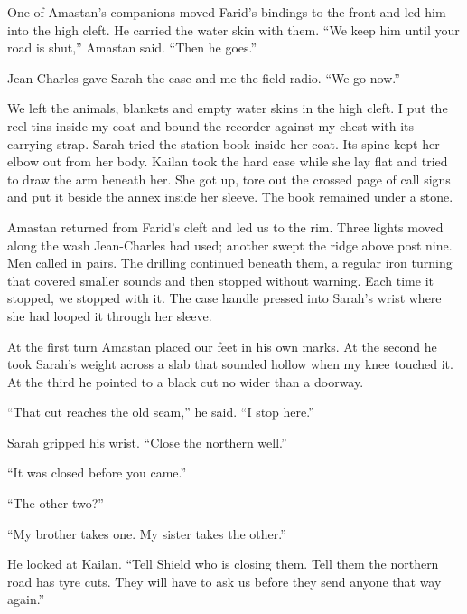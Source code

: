 One of Amastan's companions moved Farid's bindings to the front and led him into the high cleft. He carried the water skin with them. ``We keep him until your road is shut,'' Amastan said. ``Then he goes.''\par

Jean-Charles gave Sarah the case and me the field radio. ``We go now.''\par

We left the animals, blankets and empty water skins in the high cleft. I put the reel tins inside my coat and bound the recorder against my chest with its carrying strap. Sarah tried the station book inside her coat. Its spine kept her elbow out from her body. Kailan took the hard case while she lay flat and tried to draw the arm beneath her. She got up, tore out the crossed page of call signs and put it beside the annex inside her sleeve. The book remained under a stone.\par

Amastan returned from Farid's cleft and led us to the rim. Three lights moved along the wash Jean-Charles had used; another swept the ridge above post nine. Men called in pairs. The drilling continued beneath them, a regular iron turning that covered smaller sounds and then stopped without warning. Each time it stopped, we stopped with it. The case handle pressed into Sarah's wrist where she had looped it through her sleeve.\par

At the first turn Amastan placed our feet in his own marks. At the second he took Sarah's weight across a slab that sounded hollow when my knee touched it. At the third he pointed to a black cut no wider than a doorway.\par

``That cut reaches the old seam,'' he said. ``I stop here.''\par

Sarah gripped his wrist. ``Close the northern well.''\par

``It was closed before you came.''\par

``The other two?''\par

``My brother takes one. My sister takes the other.''\par

He looked at Kailan. ``Tell Shield who is closing them. Tell them the northern road has tyre cuts. They will have to ask us before they send anyone that way again.''\par

